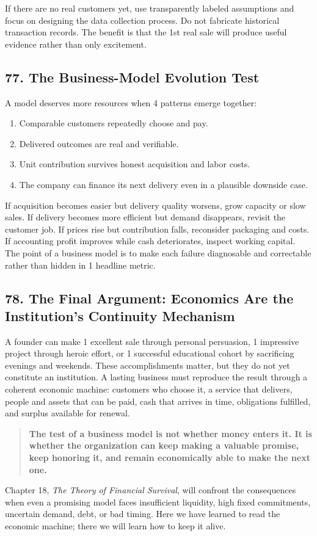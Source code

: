If there are no real customers yet, use transparently labeled assumptions and focus on designing the data collection process. Do not fabricate historical transaction records. The benefit is that the 1st real sale will produce useful evidence rather than only excitement.

\subsection*{77. The Business-Model Evolution Test}

A model deserves more resources when 4 patterns emerge together:
\begin{enumerate}
  \item Comparable customers repeatedly choose and pay.
  \item Delivered outcomes are real and verifiable.
  \item Unit contribution survives honest acquisition and labor costs.
  \item The company can finance its next delivery even in a plausible downside case.
\end{enumerate}

If acquisition becomes easier but delivery quality worsens, grow capacity or slow sales. If delivery becomes more efficient but demand disappears, revisit the customer job. If prices rise but contribution falls, reconsider packaging and costs. If accounting profit improves while cash deteriorates, inspect working capital. The point of a business model is to make each failure diagnosable and correctable rather than hidden in 1 headline metric.

\subsection*{78. The Final Argument: Economics Are the Institution's Continuity Mechanism}

A founder can make 1 excellent sale through personal persuasion, 1 impressive project through heroic effort, or 1 successful educational cohort by sacrificing evenings and weekends. These accomplishments matter, but they do not yet constitute an institution. A lasting business must reproduce the result through a coherent economic machine: customers who choose it, a service that delivers, people and assets that can be paid, cash that arrives in time, obligations fulfilled, and surplus available for renewal.

\begin{quote}
\textbf{The test of a business model is not whether money enters it. It is whether the organization can keep making a valuable promise, keep honoring it, and remain economically able to make the next one.}
\end{quote}

Chapter 18, \emph{The Theory of Financial Survival}, will confront the consequences when even a promising model faces insufficient liquidity, high fixed commitments, uncertain demand, debt, or bad timing. Here we have learned to read the economic machine; there we will learn how to keep it alive.
